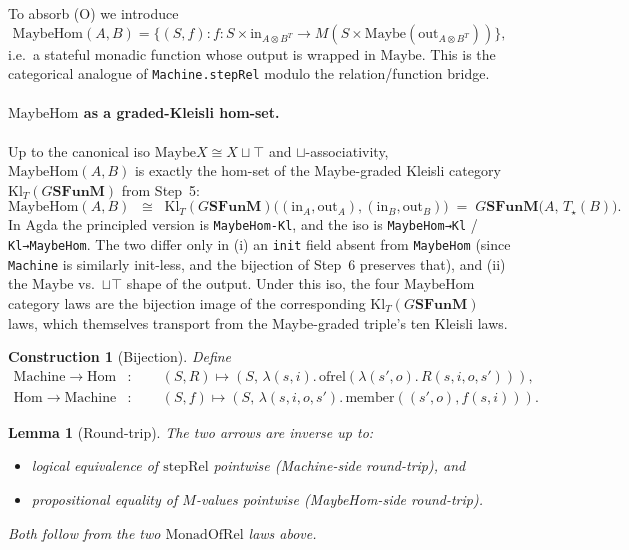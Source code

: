\documentclass[11pt]{article}
\newtheorem{lemma}[theorem]{Lemma}
\newtheorem{construction}[theorem]{Construction}
\newcommand{\SFunM}{\mathbf{SFunM}}
\newcommand{\stepRel}{\mathrm{stepRel}}
\newcommand{\Maybe}{\mathrm{Maybe}}
\begin{document}
To absorb (O) we introduce
\[
  \mathrm{MaybeHom}(A, B) = \bigl\{(S, f) : f : S \times \mathrm{in}_{A \otimes B^T}
                                \to M(S \times \Maybe(\mathrm{out}_{A \otimes B^T}))\bigr\},
\]
i.e.\ a stateful monadic function whose output is wrapped in
$\Maybe$.  This is the categorical analogue of \texttt{Machine.stepRel}
modulo the relation/function bridge.

\paragraph{$\mathrm{MaybeHom}$ as a graded-Kleisli hom-set.}
Up to the canonical iso $\Maybe X \cong X \sqcup \top$ and
$\sqcup$-associativity, $\mathrm{MaybeHom}(A, B)$ is exactly the
hom-set of the Maybe-graded Kleisli category $\mathrm{Kl}_T(G\SFunM)$
from Step~5:
\[
  \mathrm{MaybeHom}(A, B) \;\;\cong\;\;
  \mathrm{Kl}_T(G\SFunM)\bigl((\mathrm{in}_A, \mathrm{out}_A),
                              (\mathrm{in}_B, \mathrm{out}_B)\bigr)
  \;=\; G\SFunM\bigl(A,\, T_\star(B)\bigr).
\]
In Agda the principled version is \texttt{MaybeHom-Kl}, and the iso
is \texttt{MaybeHom→Kl} / \texttt{Kl→MaybeHom}.  The two differ only
in (i) an \texttt{init} field absent from \texttt{MaybeHom} (since
\texttt{Machine} is similarly init-less, and the bijection of Step~6
preserves that), and (ii) the $\Maybe$ vs.\ $\sqcup \top$ shape of
the output.  Under this iso, the four $\mathrm{MaybeHom}$ category
laws are the bijection image of the corresponding
$\mathrm{Kl}_T(G\SFunM)$ laws, which themselves transport from the
Maybe-graded triple's ten Kleisli laws.

\begin{construction}[Bijection]
Define
\begin{align*}
  \mathrm{Machine} \to \mathrm{Hom} &:\qquad
    (S, R) \mapsto (S,\, \lambda(s, i).\, \mathrm{ofrel}(\lambda(s', o).\, R(s, i, o, s'))),\\
  \mathrm{Hom} \to \mathrm{Machine} &:\qquad
    (S, f) \mapsto (S,\, \lambda(s, i, o, s').\, \mathrm{member}((s', o), f(s, i))).
\end{align*}
\end{construction}

\begin{lemma}[Round-trip]
The two arrows are inverse up to:
\begin{itemize}
  \item logical equivalence of $\stepRel$ pointwise (\emph{Machine}-side
        round-trip), and
  \item propositional equality of $M$-values pointwise
        (\emph{MaybeHom}-side round-trip).
\end{itemize}
Both follow from the two $\mathrm{MonadOfRel}$ laws above.
\end{lemma}
\end{document}

